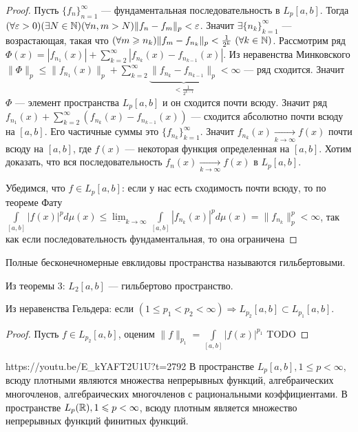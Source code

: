\begin{proof}
	Пусть $\{f_n\}_{n=1}^\infty$ --- фундаментальная последовательность в $L_p[a,b]$. Тогда $(\forall\varepsilon >0)(\exists N\in \mathbb{N})(\forall n,m>N) \|f_n-f_m\|_p<\varepsilon$. Значит $\exists\{n_k\}_{k=1}^\infty$ --- возрастающая, такая что $(\forall m\geqslant n_k) \|f_m-f_{n_k}\|_p<\frac{1}{2^k}\ (\forall k\in \mathbb{N})$. Рассмотрим ряд $\Phi(x)=|f_{n_1}(x)|+\sum\limits_{k=2}^\infty |f_{n_k}(x)-f_{n_{k-1}}(x)|$. Из неравенства Минковского $\|\Phi\|_p\leqslant \|f_{n_1}(x)\|_p+\sum\limits_{k=2}^\infty \underbrace{\|f_{n_k}-f_{n_{k-1}}\|_p}_{<\frac{1}{2^{k-1}}}<\infty$ --- ряд сходится. Значит $\Phi$ --- элемент пространства $L_p[a,b]$ и он сходится почти всюду. Значит ряд $f_{n_1}(x)+\sum\limits_{k=2}^\infty (f_{n_k}(x)-f_{n_{k-1}}(x))$ --- сходится абсолютно почти всюду на $[a,b]$. Его частичные суммы это $\{f_{n_k}\}_{k=1}^\infty$. Значит $f_{n_k}(x)\underset{k\to\infty}{\to}f(x)$ почти всюду на $[a,b]$, где $f(x)$ --- некоторая функция определенная на $[a,b]$. Хотим доказать, что вся последовательность $f_n(x)\underset{k\to\infty}{\to}f(x)$ в $L_p[a,b]$.
	
	Убедимся, что $f\in L_p[a,b]$: если у нас есть сходимость почти всюду, то по теореме Фату $\int\limits_{[a,b]}|f(x)|^pd\mu(x)\leqslant\underline{\lim}_{k\to\infty}\int\limits_{[a,b]}|f_{n_k}(x)|^pd\mu(x)=\|f_{n_k}\|^p_p<\infty$, так как если последовательность фундаментальная, то она ограничена
\end{proof}

\begin{Def}
	Полные бесконечномерные евклидовы пространства называются гильбертовыми.
\end{Def}

\begin{corollary}
	Из теоремы 3: $L_2[a,b]$ --- гильбертово пространство.
\end{corollary}

\begin{corollary}
	Из неравенства Гельдера: если $(1\leqslant p_1<p_2<\infty)\Rightarrow L_{p_2}[a,b]\subset L_{p_1}[a,b]$.
\end{corollary}
\begin{proof}
	Пусть $f\in L_{p_2}[a,b]$, оценим $\|f\|_{p_1}=\int\limits_{[a,b]} |f(x)|^{p_1}$ TODO
\end{proof}

\begin{linkthm}{https://youtu.be/E_kYAFT2U1U?t=2792}
	В пространстве $L_p[a,b], 1\leqslant p<\infty$, всюду плотными являются множества непрерывных функций, алгебраических многочленов, алгебраических многочленов с рациональными коэффициентами. В пространстве $L_p(\mathbb{R}), 1\leqslant p<\infty$, всюду плотным является множество непрерывных функций финитных функций.
\end{linkthm}

